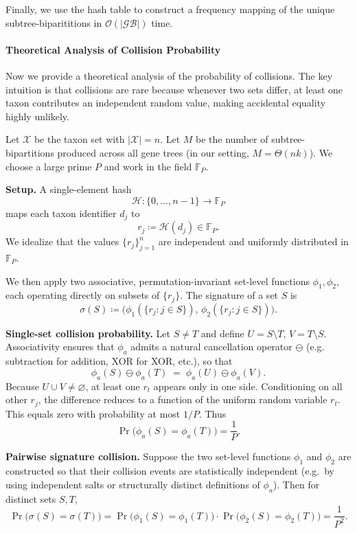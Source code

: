 \documentclass[runningheads]{llncs}
\begin{document}
Finally, we use the hash table to construct a frequency mapping of the unique subtree-biparititions in $\mathcal{O}(\mathcal{|GB|})$ time.








\paragraph{Theoretical Analysis of Collision Probability}  

Now we provide a theoretical analysis of the probability of collisions. The key intuition is that collisions are rare because whenever two sets differ, at least one taxon contributes an independent random value, making accidental equality highly unlikely.

Let $\mathcal{X}$ be the taxon set with $|\mathcal{X}|=n$. Let $M$ be the number of subtree-bipartitions produced across all gene trees (in our setting, $M=\Theta(nk)$). We choose a large prime $P$ and work in the field $\mathbb{F}_P$.

\textbf{Setup.} A single-element hash
\[
\mathcal{H}:\{0,\dots,n-1\}\to\mathbb{F}_P
\]
maps each taxon identifier $d_j$ to
\[
r_j \coloneqq \mathcal{H}(d_j)\in\mathbb{F}_P.
\]
We idealize that the values $\{r_j\}_{j=1}^n$ are independent and uniformly distributed in $\mathbb{F}_P$.

We then apply two associative, permutation-invariant set-level functions $\phi_1,\phi_2$, each operating directly on subsets of $\{r_j\}$. The signature of a set $S$ is
\[
\sigma(S) \coloneqq \big(\phi_1(\{r_j:j\in S\}),\, \phi_2(\{r_j:j\in S\})\big).
\]

\textbf{Single-set collision probability.}  
Let $S\neq T$ and define $U=S\setminus T$, $V=T\setminus S$. Associativity ensures that $\phi_a$ admits a natural cancellation operator $\ominus$ (e.g. subtraction for addition, XOR for XOR, etc.), so that
\[
\phi_a(S)\ominus\phi_a(T) \;=\; \phi_a(U)\ominus\phi_a(V).
\]
Because $U\cup V\neq\varnothing$, at least one $r_t$ appears only in one side. Conditioning on all other $r_j$, the difference reduces to a function of the uniform random variable $r_t$. This equals zero with probability at most $1/P$. Thus
\begin{equation}\label{eq:single-hash}
\Pr\big(\phi_a(S)=\phi_a(T)\big) = \frac{1}{P}.
\end{equation}

\textbf{Pairwise signature collision.}  
Suppose the two set-level functions $\phi_1$ and $\phi_2$ are constructed so that their collision events are statistically independent (e.g.\ by using independent salts or structurally distinct definitions of $\phi_a$). Then for distinct sets $S,T$,
\[
\Pr\big(\sigma(S)=\sigma(T)\big)
= \Pr\big(\phi_1(S)=\phi_1(T)\big)\cdot \Pr\big(\phi_2(S)=\phi_2(T)\big)
= \frac{1}{P^2}.
\]
\end{document}
